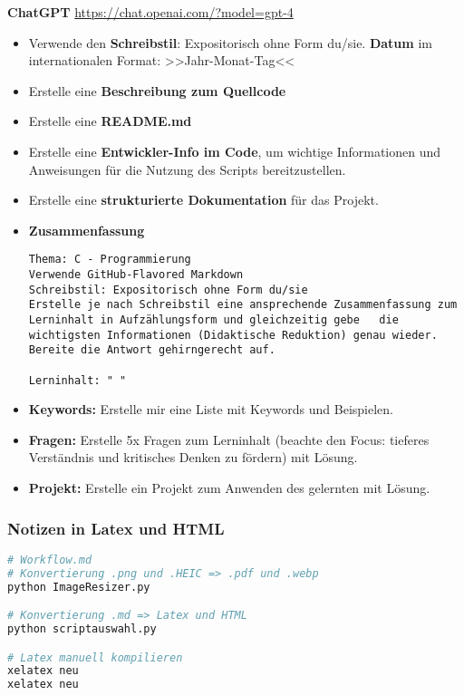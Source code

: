 \documentclass{vorlage-design-main}
\begin{document}
\textbf{ChatGPT} \url{https://chat.openai.com/?model=gpt-4}

\begin{itemize}
\item
  Verwende den \textbf{Schreibstil}: Expositorisch ohne Form du/sie.
  \textbf{Datum} im internationalen Format: >>Jahr-Monat-Tag<<
\item
  Erstelle eine \textbf{Beschreibung zum Quellcode}
\item
  Erstelle eine \textbf{README.md}
\item
  Erstelle eine \textbf{Entwickler-Info im Code}, um wichtige
  Informationen und Anweisungen für die Nutzung des Scripts
  bereitzustellen.
\item
  Erstelle eine \textbf{strukturierte Dokumentation} für das Projekt.
\item
  \textbf{Zusammenfassung}

\begin{lstlisting}
Thema: C - Programmierung
Verwende GitHub-Flavored Markdown
Schreibstil: Expositorisch ohne Form du/sie
Erstelle je nach Schreibstil eine ansprechende Zusammenfassung zum Lerninhalt in Aufzählungsform und gleichzeitig gebe   die wichtigsten Informationen (Didaktische Reduktion) genau wieder. Bereite die Antwort gehirngerecht auf.

Lerninhalt: " "
\end{lstlisting}
\item
  \textbf{Keywords:} Erstelle mir eine Liste mit Keywords und
  Beispielen.
\item
  \textbf{Fragen:} Erstelle 5x Fragen zum Lerninhalt (beachte den Focus:
  tieferes Verständnis und kritisches Denken zu fördern) mit Lösung.
\item
  \textbf{Projekt:} Erstelle ein Projekt zum Anwenden des gelernten mit
  Lösung.
\end{itemize}

\hypertarget{notizen-in-latex-und-html}{%
\subsubsection{Notizen in Latex und
HTML}\label{notizen-in-latex-und-html}}

\begin{lstlisting}[language=bash]
# Workflow.md
# Konvertierung .png und .HEIC => .pdf und .webp
python ImageResizer.py

# Konvertierung .md => Latex und HTML
python scriptauswahl.py

# Latex manuell kompilieren
xelatex neu
xelatex neu
\end{lstlisting}
\end{document}
